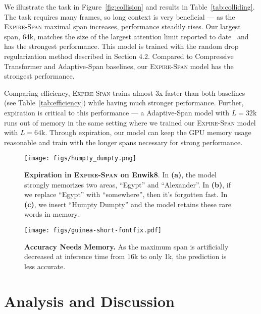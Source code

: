 We illustrate the task in Figure~\ref{fig:collision} and results in Table~\ref{tab:colliding}. The task requires many frames, so long context is very beneficial --- as the \textsc{Expire-Span} maximal span increases, performance steadily rises. Our largest span, 64k, matches the size of the largest attention limit reported to date~\citep{kitaev2019reformer} and has the strongest performance. This model is trained with the random drop regularization method described in Section 4.2. Compared to Compressive Transformer and Adaptive-Span baselines, our \textsc{Expire-Span} model has the strongest performance. 

Comparing efficiency, \textsc{Expire-Span} trains almost 3x faster than both baselines (see Table~\ref{tab:efficiency}) while having much stronger performance. Further, expiration is critical to this performance --- a Adaptive-Span model with $L=32\text{k}$ runs out of memory in the same setting where we trained our \textsc{Expire-Span} model with $L=64\text{k}$. Through expiration, our model can keep the GPU memory usage reasonable and train with the longer spans necessary for strong performance.

\begin{figure*}[t]
\begin{minipage}{0.63\textwidth}
    \centering 
    \texttt{[image: figs/humpty\_dumpty.png]}
    \caption{\textbf{Expiration in \textsc{Expire-Span} on Enwik8}. In \textbf{(a)}, the model strongly memorizes two areas,  ``Egypt'' and ``Alexander''. In \textbf{(b)}, if we replace ``Egypt'' with ``somewhere'', then it's forgotten fast. In \textbf{(c)}, we insert ``Humpty Dumpty'' and the model retains these rare words in memory.}
    \label{fig:vis_enwiki8}
\end{minipage}
\hfill
\begin{minipage}{0.33\textwidth}
\setlength{\tabcolsep}{3.2pt}
\texttt{[image: figs/guinea-short-fontfix.pdf]}
    \caption{\textbf{Accuracy Needs Memory.} As the maximum span is artificially decreased at inference time from 16k to only 1k, the prediction is less accurate.}
    \label{fig:enwik8_loss}
\end{minipage}
\end{figure*}



\section{Analysis and Discussion} 


